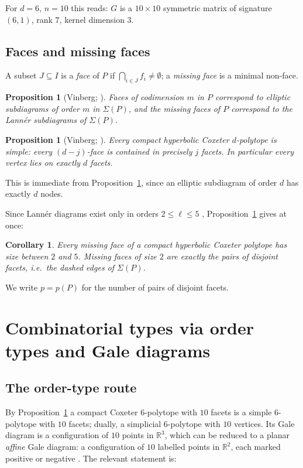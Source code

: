 \documentclass[11pt,reqno]{amsart}
\theoremstyle{plain}
\newtheorem{proposition}[theorem]{Proposition}
\newtheorem{corollary}[theorem]{Corollary}
\theoremstyle{definition}
\newcommand{\RR}{\mathbb{R}}
\newcommand{\Gr}{G}
\begin{document}
For $d=6$, $n=10$ this reads: $\Gr$ is a $10\times10$ symmetric matrix of
signature $(6,1)$, rank $7$, kernel dimension $3$.

\subsection{Faces and missing faces}
A subset $J\subseteq I$ is a \emph{face} of $P$ if $\bigcap_{i\in J}f_i\neq
\emptyset$; a \emph{missing face} is a minimal non-face.

\begin{proposition}[{Vinberg; \cite[Prop.~4.4]{Burcroff2024}}]
\label{prop:faces}
Faces of codimension $m$ in $P$ correspond to elliptic subdiagrams of order $m$
in $\Sigma(P)$, and the missing faces of $P$ correspond to the Lann\'er
subdiagrams of $\Sigma(P)$.
\end{proposition}

\begin{proposition}[{Vinberg; \cite[Remark~4.5]{Burcroff2024}}]
\label{prop:simple}
Every compact hyperbolic Coxeter $d$-polytope is simple: every $(d-j)$-face is
contained in precisely $j$ facets. In particular every vertex lies on exactly
$d$ facets.
\end{proposition}

This is immediate from Proposition~\ref{prop:faces}, since an elliptic
subdiagram of order $d$ has exactly $d$ nodes.

Since Lann\'er diagrams exist only in orders $2\le \ell\le 5$
\cite{Lanner1950}, Proposition~\ref{prop:faces} gives at once:

\begin{corollary}
\label{cor:mfsize}
Every missing face of a compact hyperbolic Coxeter polytope has size between $2$
and $5$. Missing faces of size $2$ are exactly the pairs of disjoint facets,
i.e.\ the dashed edges of $\Sigma(P)$.
\end{corollary}

We write $p=p(P)$ for the number of pairs of disjoint facets.

\section{Combinatorial types via order types and Gale diagrams}
\label{sec:types}

\subsection{The order-type route}
By Proposition~\ref{prop:simple} a compact Coxeter $6$-polytope with $10$ facets
is a simple $6$-polytope with $10$ facets; dually, a simplicial $6$-polytope
with $10$ vertices. Its Gale diagram is a configuration of $10$ points in
$\RR^{3}$, which can be reduced to a planar \emph{affine} Gale diagram: a
configuration of $10$ labelled points in $\RR^2$, each marked positive or
negative \cite{Gale1956,Ziegler1995}. The relevant statement is:
\end{document}
